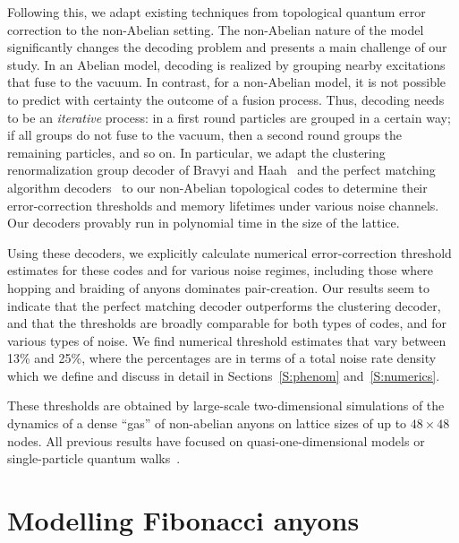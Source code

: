 \documentclass[aps, prl, letterpaper, twocolumn, superscriptaddress, notitlepage]{revtex4-1}
\begin{document}
Following this, we adapt existing techniques from topological quantum error correction to the non-Abelian setting. The non-Abelian nature of the model significantly changes the decoding problem and presents a main challenge of our study. In an Abelian model, decoding is realized by grouping nearby excitations that fuse to the vacuum. In contrast, for a non-Abelian model, it is not possible to predict with certainty the outcome of a fusion process. Thus, decoding needs to be an \emph{iterative} process: in a first round particles are grouped in a certain way; if all groups do not fuse to the vacuum, then a second round groups the remaining particles, and so on. In particular, we adapt the clustering renormalization group decoder of Bravyi and Haah~\cite{Bravyi2011} and the perfect matching algorithm decoders~\cite{Dennis2002, Wang2010} to our non-Abelian topological codes to determine their error-correction thresholds and memory lifetimes under various noise channels. Our decoders provably run in polynomial time in the size of the lattice. 

Using these decoders, we explicitly calculate numerical error-correction threshold estimates for these codes and for various noise regimes, including those where hopping and braiding of anyons dominates pair-creation. Our results seem to indicate that the perfect matching decoder outperforms the clustering decoder, and that the thresholds are broadly comparable for both types of codes, and for various types of noise. We find numerical threshold estimates that vary between 13\% and 25\%, where the percentages are in terms of a total noise rate density which we define and discuss in detail in Sections~\ref{S:phenom} and~\ref{S:numerics}. 

These thresholds are obtained by large-scale two-dimensional simulations of the dynamics of a dense ``gas'' of non-abelian anyons on lattice sizes of up to $48 \times 48$ nodes. All previous results have focused on quasi-one-dimensional models or single-particle quantum walks~\cite{Brennen2010, Lehman2011, Lehman2012, Zatloukal2012}.



\section{Modelling Fibonacci anyons}\label{s:model}
\end{document}
